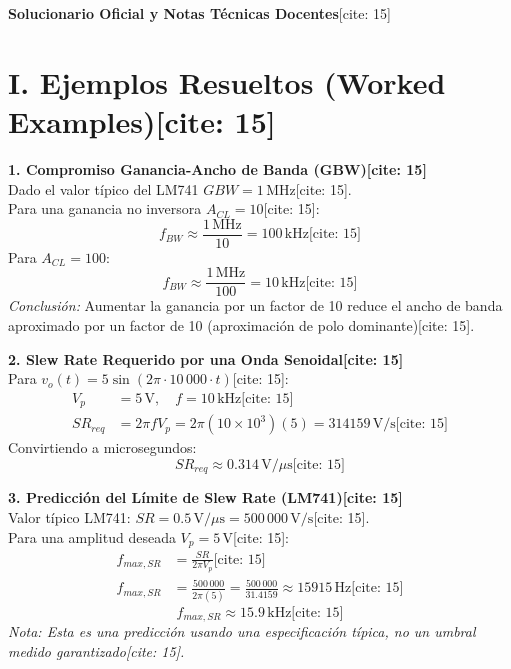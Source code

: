 \documentclass[11pt, a4paper]{article}
\begin{document}
\begin{center}
    \Large\textbf{\textcolor{ucbblue}{Solucionario Oficial y Notas Técnicas Docentes}}[cite: 15]
\end{center}

\section*{I. Ejemplos Resueltos (Worked Examples)[cite: 15]}

\textbf{1. Compromiso Ganancia-Ancho de Banda (GBW)[cite: 15]} \\
Dado el valor típico del LM741 $GBW = 1\,\text{MHz}$[cite: 15]. \\
Para una ganancia no inversora $A_{CL} = 10$[cite: 15]:
\begin{equation*}
    f_{BW} \approx \frac{1\,\text{MHz}}{10} = 100\,\text{kHz} \text{[cite: 15]}
\end{equation*}
Para $A_{CL} = 100$:
\begin{equation*}
    f_{BW} \approx \frac{1\,\text{MHz}}{100} = 10\,\text{kHz} \text{[cite: 15]}
\end{equation*}
\textit{Conclusión:} Aumentar la ganancia por un factor de 10 reduce el ancho de banda aproximado por un factor de 10 (aproximación de polo dominante)[cite: 15].

\vspace{0.3cm}
\textbf{2. Slew Rate Requerido por una Onda Senoidal[cite: 15]} \\
Para $v_o(t) = 5\sin(2\pi \cdot 10\,000 \cdot t)$[cite: 15]:
\begin{align*}
    V_p &= 5\,\text{V}, \quad f = 10\,\text{kHz} \text{[cite: 15]} \\
    SR_{req} &= 2\pi f V_p = 2\pi(10 \times 10^3)(5) = 314159\,\text{V/s} \text{[cite: 15]}
\end{align*}
Convirtiendo a microsegundos:
\begin{equation*}
    \boxed{ SR_{req} \approx 0.314\,\text{V}/\mu\text{s} } \text{[cite: 15]}
\end{equation*}

\vspace{0.3cm}
\textbf{3. Predicción del Límite de Slew Rate (LM741)[cite: 15]} \\
Valor típico LM741: $SR = 0.5\,\text{V}/\mu\text{s} = 500\,000\,\text{V/s}$[cite: 15]. \\
Para una amplitud deseada $V_p = 5\,\text{V}$[cite: 15]:
\begin{align*}
    f_{max,SR} &= \frac{SR}{2\pi V_p} \text{[cite: 15]} \\
    f_{max,SR} &= \frac{500\,000}{2\pi(5)} = \frac{500\,000}{31.4159} \approx 15915\,\text{Hz} \text{[cite: 15]}
\end{align*}
\begin{equation*}
    \boxed{ f_{max,SR} \approx 15.9\,\text{kHz} } \text{[cite: 15]}
\end{equation*}
\textit{Nota: Esta es una predicción usando una especificación típica, no un umbral medido garantizado[cite: 15].}
\end{document}
